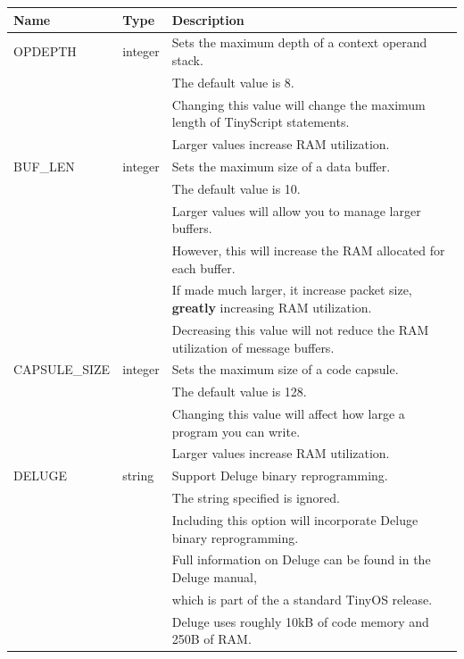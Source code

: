 \documentclass[12pt]{article}
\begin{document}
\vspace{1ex}
{\scriptsize
\begin{tabular}{|l|l|l|}\hline
Name  & Type & Description \\ \hline
OPDEPTH      & integer & Sets the maximum depth of a context operand stack. \\
             &         & The default value is 8.\\
             &         & Changing this value will change the maximum length of  TinyScript statements.\\
             &         & Larger values increase RAM utilization.\\\hline
BUF\_LEN      & integer & Sets the maximum size of a data buffer.\\
             &         & The default value is 10.\\
	     &         & Larger values will allow you to manage larger buffers. \\
             &         & However, this will increase the RAM allocated for each buffer.\\
             &         & If made much larger, it increase packet size, {\bf greatly} increasing RAM utilization.\\
             &         & Decreasing this value will not reduce the RAM utilization of message buffers.\\ \hline
CAPSULE\_SIZE & integer & Sets the maximum size of a code capsule.\\
             &         & The default value is 128.\\
             &         & Changing this value will affect how large a program you can write.\\
             &         & Larger values increase RAM utilization.\\ \hline
DELUGE       & string  & Support Deluge binary reprogramming. \\ \hline
             &         & The string specified is ignored. \\
             &         & Including this option will incorporate Deluge binary reprogramming. \\
             &         & Full information on Deluge can be found in the Deluge manual, \\
             &         & which is part of the a standard TinyOS release.\\
             &         & Deluge uses roughly 10kB of code memory and 250B of RAM. \\\hline
\end{tabular}
}
\vspace{1ex}
\end{document}
